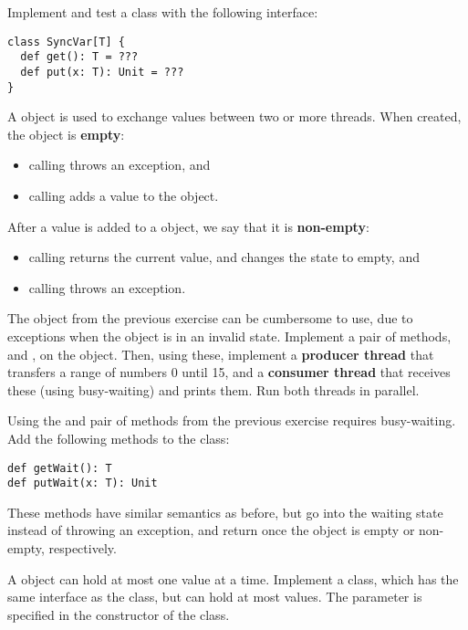 \documentclass[11pt]{article}
\begin{document}
\begin{myExercise}Implement and test a  class with the following interface:
\begin{lstlisting}
class SyncVar[T] {
  def get(): T = ???
  def put(x: T): Unit = ???
}
\end{lstlisting}
A  object is used to exchange values between two or more threads.
When created, the  object is \textbf{empty}:
\begin{itemize}
  \item calling  throws an exception, and
  \item calling  adds a value to the  object.
\end{itemize}
After a value is added to a  object, we say that it is \textbf{non-empty}:
\begin{itemize}
  \item calling  returns the current value, and changes the state to empty, and
  \item calling  throws an exception.
\end{itemize}
\end{myExercise}

\begin{myExercise}The  object from the previous exercise can be cumbersome to use, due to exceptions when the  object is in an invalid state. Implement a pair of methods,  and , on the  object. Then, using these, implement a \textbf{producer thread} that transfers a range of numbers 0 until 15, and a \textbf{consumer thread} that receives these (using busy-waiting) and prints them. Run both threads in parallel.
\end{myExercise}

\begin{myExercise}Using the  and  pair of methods from the previous exercise requires busy-waiting. Add the following methods to the  class:
\begin{lstlisting}
def getWait(): T
def putWait(x: T): Unit
\end{lstlisting}
These methods have similar semantics as before, but go into the waiting state instead of throwing an exception, and return once the  object is empty or non-empty, respectively.
\end{myExercise}

\begin{myExercise}A  object can hold at most one value at a time. Implement a  class, which has the same interface as the  class, but can hold at most  values. The  parameter is specified in the constructor of the  class.
\end{myExercise}
\end{document}
